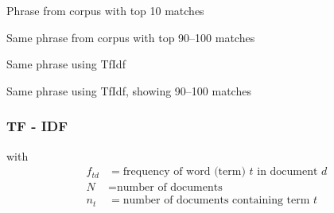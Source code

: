 \begin{frame}
  Phrase from corpus with top 10 matches
\end{frame}

\begin{frame}
  Same phrase from corpus with top 90--100 matches
\end{frame}

\begin{frame}
  Same phrase using TfIdf
\end{frame}

\begin{frame}
  Same phrase using TfIdf, showing 90--100 matches
\end{frame}

\begin{frame}
  \frametitle{TF - IDF}

  with
  \begin{align*}
    f_{td} &= \mbox{frequency of word (term) $t$ in document $d$} \\
    N &= \mbox{number of documents}\\
    n_t &= \mbox{number of documents containing term $t$}
  \end{align*}
\end{frame}

\begin{frame}
\end{frame}

\begin{frame}
\end{frame}

\begin{frame}
\end{frame}

\begin{frame}
\end{frame}

\begin{frame}
\end{frame}

